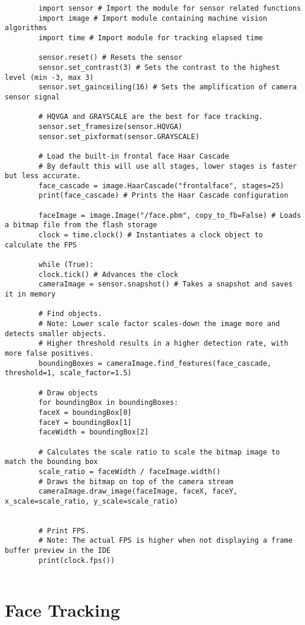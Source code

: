 	\begin{verbatim}
		import sensor # Import the module for sensor related functions
		import image # Import module containing machine vision algorithms
		import time # Import module for tracking elapsed time
		
		sensor.reset() # Resets the sensor
		sensor.set_contrast(3) # Sets the contrast to the highest level (min -3, max 3)
		sensor.set_gainceiling(16) # Sets the amplification of camera sensor signal
		
		# HQVGA and GRAYSCALE are the best for face tracking.
		sensor.set_framesize(sensor.HQVGA)
		sensor.set_pixformat(sensor.GRAYSCALE)
		
		# Load the built-in frontal face Haar Cascade
		# By default this will use all stages, lower stages is faster but less accurate.
		face_cascade = image.HaarCascade("frontalface", stages=25)
		print(face_cascade) # Prints the Haar Cascade configuration
		
		faceImage = image.Image("/face.pbm", copy_to_fb=False) # Loads a bitmap file from the flash storage
		clock = time.clock() # Instantiates a clock object to calculate the FPS
		
		while (True):
		clock.tick() # Advances the clock
		cameraImage = sensor.snapshot() # Takes a snapshot and saves it in memory
		
		# Find objects.
		# Note: Lower scale factor scales-down the image more and detects smaller objects.
		# Higher threshold results in a higher detection rate, with more false positives.
		boundingBoxes = cameraImage.find_features(face_cascade, threshold=1, scale_factor=1.5)
		
		# Draw objects
		for boundingBox in boundingBoxes:
		faceX = boundingBox[0]
		faceY = boundingBox[1]
		faceWidth = boundingBox[2]
		
		# Calculates the scale ratio to scale the bitmap image to match the bounding box
		scale_ratio = faceWidth / faceImage.width()
		# Draws the bitmap on top of the camera stream
		cameraImage.draw_image(faceImage, faceX, faceY, x_scale=scale_ratio, y_scale=scale_ratio)
		
		
		# Print FPS.
		# Note: The actual FPS is higher when not displaying a frame buffer preview in the IDE
		print(clock.fps())
		
	\end{verbatim}

	\section{Face Tracking}

